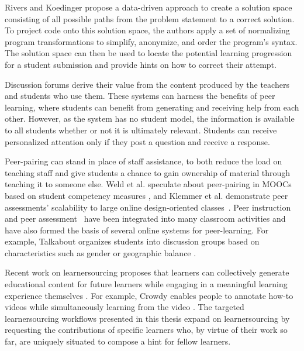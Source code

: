Rivers and Koedinger \cite{riversaied} propose a data-driven approach to create a solution space consisting of all possible paths from the problem statement to a correct solution. To project code onto this solution space, the authors apply a set of normalizing program transformations to simplify, anonymize, and order the program's syntax. The solution space can then be used to locate the potential learning progression for a student submission and provide hints on how to correct their attempt. %

Discussion forums derive their value from the content produced by the teachers and students who use them. These systems can harness the benefits of peer learning, where students can benefit from generating and receiving help from each other. However, as the system has no student model, the information is available to all students whether or not it is ultimately relevant. Students can receive personalized attention only if they post a question and receive a response. 

Peer-pairing can stand in place of staff assistance, to both reduce the load on teaching staff and give students a chance to gain ownership of material through teaching it to someone else. Weld et al. speculate about peer-pairing in MOOCs based on student competency measures \cite{WeldHcomp12}, and Klemmer et al. demonstrate peer assessments' scalability to large online design-oriented classes~\cite{Klemmer}. Peer instruction~\cite{mazur} and peer assessment~\cite{peerassessment} have been integrated into many classroom activities and have also formed the basis of several online systems for peer-learning. For example, Talkabout organizes students into discussion groups based on characteristics such as gender or geographic balance \cite{talkabout}.

Recent work on learnersourcing proposes that learners can collectively generate educational content for future learners while engaging in a meaningful learning experience themselves \cite{kim2013learnersourcing,weir2015,mitros2015}. For example, Crowdy enables people to annotate how-to videos while simultaneously learning from the video \cite{weir2015}. The targeted learnersourcing workflows presented in this thesis expand on learnersourcing by requesting the contributions of specific learners who, by virtue of their work so far, are uniquely situated to compose a hint for fellow learners. %

